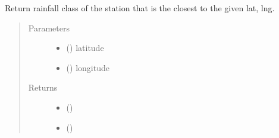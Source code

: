 \documentclass[letterpaper,10pt,english]{sphinxmanual}
\begin{document}
\begin{fulllineitems}
\label{\detokenize{index:flood_tool.get_rainfall_classifier_from_lat_lng}}
\sphinxAtStartPar
Return rainfall class of the station
that is the closest to the given lat, lng.
\begin{quote}\begin{description}
\item[{Parameters}] \leavevmode\begin{itemize}
\item {} 
\sphinxAtStartPar
{} () \textendash{} latitude

\item {} 
\sphinxAtStartPar
{} () \textendash{} longitude

\end{itemize}

\item[{Returns}] \leavevmode
\sphinxAtStartPar
\begin{itemize}
\item {} 
\sphinxAtStartPar
{} ()

\item {} 
\sphinxAtStartPar
{} ()

\end{itemize}


\end{description}\end{quote}

\end{fulllineitems}

\end{document}
